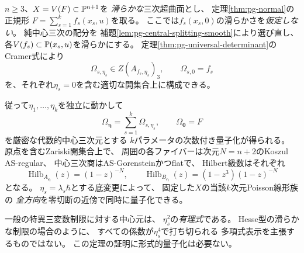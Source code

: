\begin{theorem}[全てのPoissonブロックの多変数同時量子化]
\label{thm:pg-ad-all-poisson}
$n\ge3$、$X=V(F)\subset\mathbb P^{n+1}$を
\emph{滑らかな}三次超曲面とし、
定理\ref{thm:pg-normal}の正規形
$F=\sum_{s=1}^k f_s(x_s,u)$を取る。
ここでは$f_s(x_s,0)$の滑らかさを\emph{仮定しない}。
純中心三次の配分を
補題\ref{lem:pg-central-splitting-smooth}により選び直し、
各$V(f_s)\subset\mathbb P(x_s,u)$を滑らかにする。
定理\ref{thm:pg-universal-determinant}のCramer式により
\begin{equation}
 \Omega_{s,\eta_s}\in
 Z(A_{f_s,\eta_s})_3,\qquad
 \Omega_{s,0}=f_s
 \label{eq:pg-ad-general-block-center}
\end{equation}
を、それぞれ$\eta_s=0$を含む適切な開集合上に構成できる。

従って$\eta_1,\ldots,\eta_k$を独立に動かして
\begin{equation}
 \boxed{\qquad
 \Omega_{\boldsymbol\eta}=\sum_{s=1}^k\Omega_{s,\eta_s},
 \qquad
 \Omega_{\boldsymbol0}=F
 \qquad}
 \label{eq:pg-ad-general-center}
\end{equation}
を厳密な代数的中心三次元とする
$k$パラメータの次数付き量子化が得られる。
原点を含むZariski開集合上で、
周囲の各ファイバーは次元$N=n+2$のKoszul AS-regular、
中心三次商はAS-Gorensteinかつflatで、
Hilbert級数はそれぞれ
\begin{equation}
 \operatorname{Hilb}_{A_{\boldsymbol\eta}}(z)=(1-z)^{-N},
 \qquad
 \operatorname{Hilb}_{B_{\boldsymbol\eta}}(z)
 =(1-z^3)(1-z)^{-N}
 \label{eq:pg-ad-general-hilbert}
\end{equation}
となる。
$\eta_s=\lambda_s\hbar$とする底変更によって、
固定した$X$の当該$k$次元Poisson線形族の
\emph{全方向}を零切断の近傍で同時に量子化できる。

一般の特異三変数制限に対する中心元は、
$\eta_s^2$の\emph{有理式}である。
Hesse型の滑らかな制限の場合のように、
すべての係数が$\eta_s^4$で打ち切られる
多項式表示を主張するものではない。
この定理の証明に形式的量子化は必要ない。
\end{theorem}
